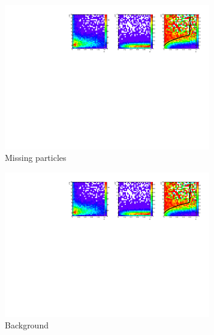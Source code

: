 \begin{figure}
	\centering
	\begin{subfigure}{0.33\textwidth}
		\includegraphics[clip, trim=0.1cm 0cm 13.9cm 0cm,width=0.99\textwidth]{ILD/plots/recovery-purity.pdf}
		\caption{\label{fig:RecoveryPurity_a_3} Missing particles}
	\end{subfigure}%
	\begin{subfigure}{0.33\textwidth}
		\centering
		\includegraphics[clip, trim=6.78cm 0cm 7.3cm 0cm,width=0.99\textwidth]{ILD/plots/recovery-purity.pdf}
		\caption{\label{fig:RecoveryPurity_b_3} Background}
	\end{subfigure}
	\begin{subfigure}{0.33\textwidth}
		\centering

\end{subfigure}
\end{figure}
